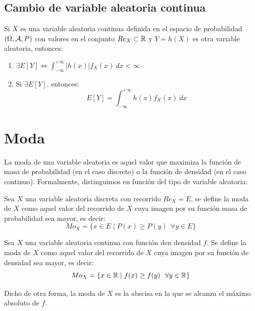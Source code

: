 \subsection{Cambio de variable aleatoria continua}

\begin{teo}
    Si $X$ es una variable aleatoria continua definida en el espacio de probabilidad $(\Omega, \mathcal{A}, P)$ con valores en el conjunto $Re_X \subset \mathbb R$ y $Y=h(X)$ es otra variable aleatoria, entonces:
    \begin{enumerate}
        \item $\displaystyle \exists E[Y]\Longleftrightarrow \int_{-\infty}^{+\infty} |h(x)|f_X(x)~dx < \infty$
        \item Si $\displaystyle \exists E[Y]$, entonces:
        \begin{equation*}
            E[Y] = \int_{-\infty}^{+\infty} h(x)f_X(x)~dx
        \end{equation*}
    \end{enumerate}
\end{teo}

\section{Moda}

La moda de una variable aleatoria es aquel valor que maximiza la función de masa de probabilidad (en el caso discreto) o la función de densidad (en el caso continuo). Formalmente, distinguimos en función del tipo de variable aleatoria:
\begin{definicion}
    Sea $X$ una variable aleatoria discreta con recorrido $Re_X=E$, se define la moda de $X$ como aquel valor del recorrido de $X$ cuya imagen por su función masa de probabilidad sea mayor, es decir:
    $$Mo_X = \{x \in E \mid P(x) \geq P(y)~~\forall y \in E\}$$
\end{definicion}

\begin{definicion}
    Sea $X$ una variable aleatoria continua con función den densidad $f$. Se define la moda de $X$ como aquel valor del recorrido de $X$ cuya imagen por su función de densidad sea mayor, es decir:
    $$Mo_X = \{x \in \mathbb{R} \mid f(x) \geq f(y)~~\forall y \in \mathbb{R}\}$$
    
    Dicho de otra forma, la moda de $X$ es la abscisa en la que se alcanza el máximo absoluto de $f$.
\end{definicion}

